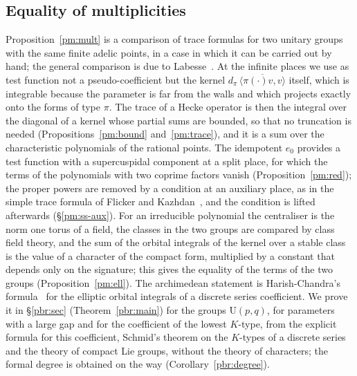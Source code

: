 \documentclass[10pt]{amsart}
\theoremstyle{definition}
\theoremstyle{remark}
\providecommand{\auU}{\mathrm U}
\providecommand{\aubar}[1]{\overline{#1}}
\begin{document}
\subsection*{Equality of multiplicities}
Proposition~\ref{pm:mult} is a comparison of trace formulas for two unitary groups with the same
finite adelic points, in a case in which it can be carried out by hand; the general comparison is
due to Labesse~\cite{Labesse}. At the infinite places we use as test function not a
pseudo-coefficient but the kernel $d_\pi\,\aubar{\langle\pi(\cdot)v,v\rangle}$ itself, which is
integrable because the parameter is far from the walls and which projects exactly onto the forms
of type $\pi$. The trace of a Hecke operator is then the integral over the diagonal of a kernel
whose partial sums are bounded, so that no truncation is needed (Propositions~\ref{pm:bound}
and~\ref{pm:trace}), and it is a sum over the characteristic polynomials of the rational points.
The idempotent $e_0$ provides a test function with a supercuspidal component at a split place,
for which the terms of the polynomials with two coprime factors vanish
(Proposition~\ref{pm:red}); the proper powers are removed by a condition at an auxiliary place, as
in the simple trace formula of Flicker and Kazhdan~\cite{FlickerKazhdan}, and the condition is
lifted afterwards (\S\ref{pm:ss-aux}). For an irreducible polynomial the centraliser is the norm
one torus of a field, the classes in the two groups are compared by class field theory, and the
sum of the orbital integrals of the kernel over a stable class is the value of a character of the
compact form, multiplied by a constant that depends only on the signature; this gives the equality
of the terms of the two groups (Proposition~\ref{pm:ell}). The archimedean statement is
Harish-Chandra's formula~\cite{HC66} for the
elliptic orbital integrals of a discrete series coefficient. We prove it in
\S\ref{pbr:sec} (Theorem~\ref{pbr:main}) for the groups $\auU(p,q)$, for parameters with a
large gap and for the coefficient of the lowest $K$-type, from the explicit formula for this
coefficient, Schmid's theorem on the $K$-types of a discrete series~\cite{Schmid75} and the theory
of compact Lie groups, without the theory of characters; the formal degree is obtained on the way
(Corollary~\ref{pbr:degree}).
\end{document}
